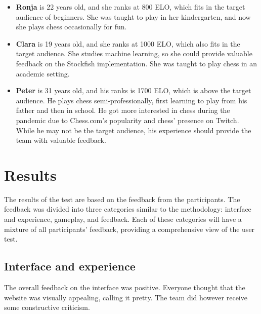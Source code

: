 \begin{itemize}

    \item \textbf{Ronja} is 22 years old, and she ranks at 800 ELO, which fits in the target audience of beginners.
    She was taught to play in her kindergarten, and now she plays chess occasionally for fun.

    \item \textbf{Clara} is 19 years old, and she ranks at 1000 ELO, which also fits in the target audience.
    She studies machine learning, so she could provide valuable feedback on the Stockfish implementation.
    She was taught to play chess in an academic setting.

    \item \textbf{Peter} is 31 years old, and his ranks is 1700 ELO, which is above the target audience.
    He plays chess semi-professionally, first learning to play from his father and then in school.
    He got more interested in chess during the pandemic due to Chess.com's popularity and chess' presence on Twitch.
    While he may not be the target audience, his experience should provide the team with valuable feedback.

\end{itemize}



\section{Results}\label{sec:results}

The results of the test are based on the feedback from the participants.
The feedback was divided into three categories similar to the methodology: interface and experience, gameplay, and
feedback.
Each of these categories will have a mixture of all participants' feedback, providing a comprehensive view of the user
test.

\subsection{Interface and experience}\label{subsec:ui/ux}

The overall feedback on the interface was positive.
Everyone thought that the website was visually appealing, calling it pretty.
The team did however receive some constructive criticism.

